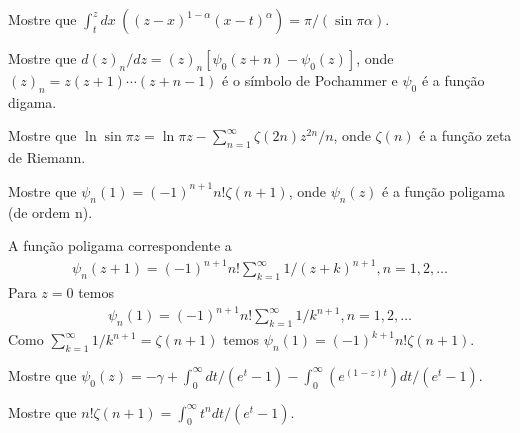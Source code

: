 \documentclass[a4paper,12pt, leqno, answers]{exam}
\begin{document}
\begin{questions}
    \question Mostre que $\int_t^z dx \ \left( \left( z - x \right)^{1 - \alpha} \left( x - t \right)^{\alpha} \right) = \pi / \left( \sin \pi \alpha \right)$.
    \begin{solution}
    \end{solution}

    \question Mostre que $d \left( z \right)_n / d z = \left( z \right)_n \left[ \psi_0 \left( z + n \right) - \psi_0\left( z \right) \right]$, onde $\left( z \right)_n = z \left( z + 1 \right) \cdots \left( z + n - 1 \right)$ \'{e} o s\'{i}mbolo de Pochammer e $\psi_0$ \'{e} a fun\c{c}\~{a}o digama.
    \begin{solution}
    \end{solution}

    \question Mostre que $\ln \sin \pi z = \ln \pi z - \sum_{n = 1}^\infty \zeta(2n) z^{2n} / n$, onde $\zeta(n)$ \'{e} a fun\c{c}\~{a}o zeta de Riemann.
    \begin{solution}
    \end{solution}

    \question Mostre que $\psi_n(1) = \left( -1 \right)^{n + 1} n! \zeta(n + 1)$, onde $\psi_n(z)$ \'{e} a fun\c{c}\~{a}o poligama (de ordem n).
    \begin{solution}
        A fun\c{c}\~{a}o poligama correspondente a
        \begin{align*}
            \psi_n(z + 1) = (-1)^{n + 1} n! \sum_{k = 1}^\infty 1/(z + k)^{n + 1}, n = 1, 2, \ldots
        \end{align*}
        Para $z = 0$ temos
        \begin{align*}
            \psi_n(1) = (-1)^{n + 1}n ! \sum_{k = 1}^\infty 1/k^{n + 1}, n = 1, 2, \ldots
        \end{align*}
        Como $\sum_{k = 1}^\infty 1/k^{n + 1} = \zeta(n + 1)$ temos $\psi_n(1) = (-1)^{k + 1} n! \zeta(n + 1)$.
    \end{solution}

    \question Mostre que $\psi_0(z) = -\gamma + \int_0^\infty dt / \left( e^t - 1 \right) - \int_0^\infty \left( e^{\left( 1 - z \right) t} \right) dt / \left( e^t - 1 \right)$.
    \begin{solution}
    \end{solution}

    \question Mostre que $n! \zeta(n + 1) = \int_0^\infty t^n dt / \left( e^t - 1 \right)$.
    \begin{solution}
    \end{solution}


\end{questions}
\end{document}
